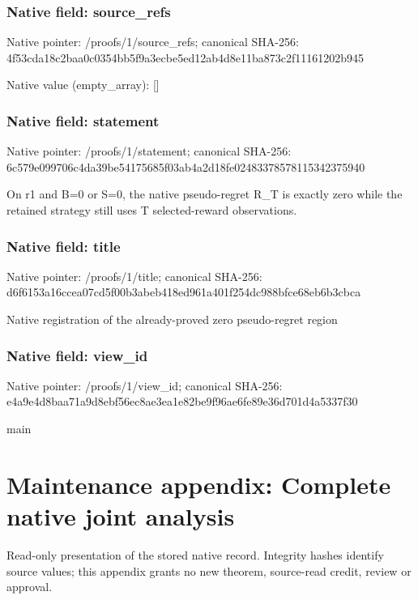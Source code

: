 \documentclass[10pt,a4paper]{article}
\begin{document}
\subsubsection{Native field: source\_\allowbreak{}refs}
Native pointer: /proofs/1/source\_\allowbreak{}refs; canonical SHA-256: 4f53cda18c2baa0c0354bb5f9a3ecbe5ed12ab4d8e11ba873c2f11161202b945

Native value (empty\_\allowbreak{}array): []

\subsubsection{Native field: statement}
Native pointer: /proofs/1/statement; canonical SHA-256: 6c579e099706c4da39be54175685f03ab4a2d18fe02483378578115342375940

\begingroup\raggedright\sloppy On r1 and B=\allowbreak{}0 or S=\allowbreak{}0,\allowbreak{} the native pseudo-regret R\_\allowbreak{}T is exactly zero while the retained strategy still uses T selected-reward observations.\par\endgroup

\subsubsection{Native field: title}
Native pointer: /proofs/1/title; canonical SHA-256: d6f6153a16ccea07cd5f00b3abeb418ed961a401f254dc988bfce68eb6b3cbca

\begingroup\raggedright\sloppy Native registration of the already-proved zero pseudo-regret region\par\endgroup

\subsubsection{Native field: view\_\allowbreak{}id}
Native pointer: /proofs/1/view\_\allowbreak{}id; canonical SHA-256: e4a9e4d8baa71a9d8ebf56ec8ae3ea1e82be9f96ae6fe89e36d701d4a5337f30

\begingroup\raggedright\sloppy main\par\endgroup

\section{Maintenance appendix: Complete native joint analysis}
Read-only presentation of the stored native record. Integrity hashes identify source values; this appendix grants no new theorem, source-read credit, review or approval.
\end{document}
